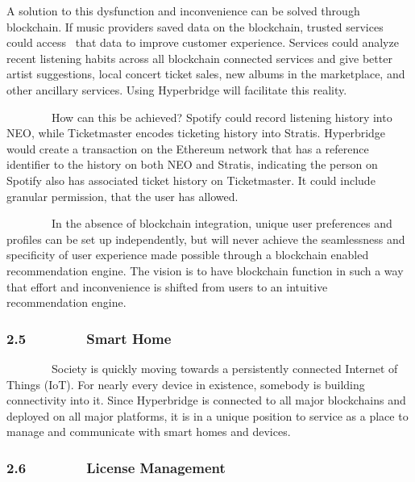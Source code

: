 \documentclass[]{article}
\begin{document}
{}

{A solution to this dysfunction and inconvenience can be solved through
blockchain. If music providers saved data on the blockchain, trusted
services could access ~that data to improve customer experience.
Services could analyze recent listening habits across all blockchain
connected services and give better artist suggestions, local concert
ticket sales, new albums in the marketplace, and other ancillary
services. Using Hyperbridge will facilitate this reality. }

{}

{~~~~~~~~How can this be achieved? Spotify could record listening
history into NEO, while Ticketmaster encodes ticketing history into
Stratis. Hyperbridge would create a transaction on the Ethereum network
that has a reference identifier to the history on both NEO and Stratis,
indicating the person on Spotify also has associated ticket history on
Ticketmaster. It could include granular permission, that the user has
allowed. }

{}

{~~~~~~~~In the absence of blockchain integration, unique user
preferences and profiles can be set up independently, but will never
achieve the seamlessness and specificity of user experience made
possible through a blockchain enabled recommendation engine. The vision
is to have blockchain function in such a way that effort and
inconvenience is shifted from users to an intuitive recommendation
engine. }

{}

{}

\hypertarget{h.yijfdpnvz4k0}{%
\subsubsection{\texorpdfstring{{2.5~~~~~~~~Smart
Home}}{2.5~~~~~~~~Smart Home}}\label{h.yijfdpnvz4k0}}

{~~~~~~~~Society is quickly moving towards a persistently connected
Internet of Things (IoT). For nearly every device in existence, somebody
is building connectivity into it. Since Hyperbridge is connected to all
major blockchains and deployed on all major platforms, it is in a unique
position to service as a place to manage and communicate with smart
homes and devices. }

\hypertarget{h.8faks1k6o2ft}{%
\subsubsection{\texorpdfstring{{2.6~~~~~~~~License
Management}}{2.6~~~~~~~~License Management}}\label{h.8faks1k6o2ft}}
\end{document}
